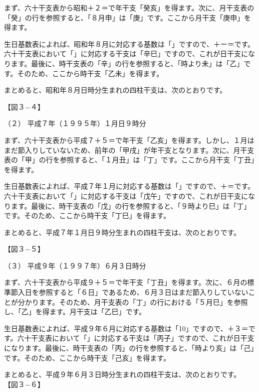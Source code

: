 \documentclass[a5paper,11pt,dvipdfmx]{tarticle}
\begin{document}
まず、六十干支表から昭和＋２＝で年干支「癸亥」を得ます。次に、月干支表の「癸」の行を参照すると、「８月申」は「庚」です。ここから月干支「庚申」を得ます。

生日基数表によれば、昭和年８月に対応する基数は「」ですので、＋ー＝です。六十干支表において「」に対応する干支は「辛巳」ですので、これが日干支になります。最後に、時干支表の「辛」の行を参照すると、「時より未」は「乙」です。そのため、ここから時干支「乙未」を得ます。

まとめると、昭和年８月日時分生まれの四柱干支は、次のとおりです。

【図３−４】

（２）	平成７年（１９９５年）１月日９時分

まず、六十干支表から平成７＋５＝で年干支「乙亥」を得ます。しかし、１月はまだ節入りしていないため、前年の「甲戌」が年干支となります。次に、月干支表の「甲」の行を参照すると、「１月丑」は「丁」です。ここから月干支「丁丑」を得ます。

生日基数表によれば、平成７年１月に対応する基数は「」ですので、＋＝です。六十干支表において「」に対応する干支は「戊午」ですので、これが日干支になります。最後に、時干支表の「戊」の行を参照すると、「９時より巳」は「丁」です。そのため、ここから時干支「丁巳」を得ます。

まとめると、平成７年１月日９時分生まれの四柱干支は、次のとおりです。

【図３−５】

（３）	平成９年（１９９７年）６月３日時分

まず、六十干支表から平成９＋５＝で年干支「丁丑」を得ます。次に、６月の標準節入日を参照すると「６日」であるため、６月３日はまだ節入りしていないことが分かります。そのため、月干支表の「丁」の行における「５月巳」を参照し、「乙」を得ます。月干支は「乙巳」です。

生日基数表によれば、平成９年６月に対応する基数は「10」ですので、＋３＝です。六十干支表において「」に対応する干支は「丙子」ですので、これが日干支になります。最後に、時干支表の「丙」の行を参照すると、「時より亥」は「己」です。そのため、ここから時干支「己亥」を得ます。

まとめると、平成９年６月３日時分生まれの四柱干支は、次のとおりです。
【図３−６】
\end{document}
